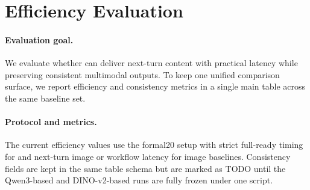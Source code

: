 \section{Efficiency Evaluation}
\label{sec:efficiency}

\paragraph{Evaluation goal.}
We evaluate whether \dn can deliver next-turn content with practical latency while preserving consistent multimodal outputs. To keep one unified comparison surface, we report efficiency and consistency metrics in a single main table across the same baseline set.

\paragraph{Protocol and metrics.}
The current efficiency values use the formal20 setup with strict full-ready timing for \dn and next-turn image or workflow latency for image baselines. Consistency fields are kept in the same table schema but are marked as TODO until the Qwen3-based and DINO-v2-based runs are fully frozen under one script.

\begin{table}[t]
\centering
\small
{}
\caption{Main results under a unified protocol. Efficiency rows are populated from the latest formal20 summary. Consistency rows are placeholders pending unified evaluation artifacts: \texttt{[PATH\_TO\_QWEN3\_CONSISTENCY\_RESULTS]} and \texttt{[PATH\_TO\_DINO\_CONSISTENCY\_RESULTS]}.}
\label{tab:main-results-3in1}
\end{table}

